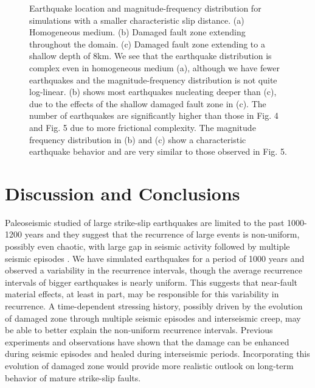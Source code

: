 \documentclass[11pt]{article}
\begin{document}
\begin{figure}[!htb]
{    }
    \caption{Earthquake location and magnitude-frequency distribution for simulations with a smaller characteristic slip distance. (a) Homogeneous medium. (b) Damaged fault zone extending throughout the domain. (c) Damaged fault zone extending to a shallow depth of 8km. We see that the earthquake distribution is complex even in homogeneous medium (a), although we have fewer earthquakes and the magnitude-frequency distribution is not quite log-linear. (b) shows most earthquakes nucleating deeper than (c), due to the effects of the shallow damaged fault zone in (c). The number of earthquakes are significantly higher than those in Fig. 4 and Fig. 5 due to more frictional complexity. The magnitude frequency distribution in (b) and (c) show a characteristic earthquake behavior and are very similar to those observed in Fig. 5.}
\end{figure}

\section{Discussion and Conclusions}
Paleoseismic studied of large strike-slip earthquakes are limited to the past 1000-1200 years and they suggest that the recurrence of large events is non-uniform, possibly even chaotic, with large gap in seismic activity followed by multiple seismic episodes \citep{goes_1996, seitz_2013, fumal_2002, toke_2006}. We have simulated earthquakes for a period of 1000 years and observed a variability in the recurrence intervals, though the average recurrence intervals of bigger earthquakes is nearly uniform. This suggests that near-fault material effects, at least in part, may be responsible for this variability in recurrence. A time-dependent stressing history, possibly driven by the evolution of damaged zone through multiple seismic episodes and interseismic creep, may be able to better explain the non-uniform  recurrence intervals.  Previous experiments and observations \citep{peng_2006, stanchits_2006} have shown that the damage can be enhanced during seismic episodes and healed during interseismic periods. Incorporating this evolution of damaged zone would provide more realistic outlook on long-term behavior of mature strike-slip faults.
\end{document}
